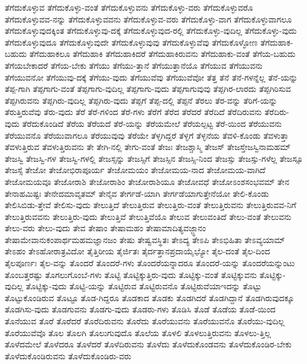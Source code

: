 {ತೆಗೆದುಕೊಳ್ಳುವ
ತೆಗೆದುಕೊಳ್ಳು-ವಂತೆ
ತೆಗೆದುಕೊಳ್ಳುವನು
ತೆಗೆದುಕೊಳ್ಳು-ವರು
ತೆಗೆದುಕೊಳ್ಳುವರೊ
ತೆಗೆದುಕೊಳ್ಳುವವ-ನನ್ನು
ತೆಗೆದುಕೊಳ್ಳುವವನು
ತೆಗೆದುಕೊಳ್ಳುವ-ವರು
ತೆಗೆದುಕೊಳ್ಳು-ವಾಗ
ತೆಗೆದುಕೊಳ್ಳುವಾಗಲೂ
ತೆಗೆದುಕೊಳ್ಳುವುದಕ್ಕಿಂತ
ತೆಗೆದುಕೊಳ್ಳುವು-ದಕ್ಕೆ
ತೆಗೆದುಕೊಳ್ಳುವುದ-ರಲ್ಲಿ
ತೆಗೆದುಕೊಳ್ಳು-ವುದಿಲ್ಲ
ತೆಗೆದುಕೊಳ್ಳು-ವುದು
ತೆಗೆದುಕೊಳ್ಳುವುದೂ
ತೆಗೆದುಕೊಳ್ಳುವುದೇ
ತೆಗೆದುಕೊಳ್ಳುವುವು
ತೆಗೆದುಕೊಳ್ಳುವೆವು
ತೆಗೆದುಕೊಳ್ಳೋಣ
ತೆಗೆದುಹಾಕ-ಬಹುದು
ತೆಗೆದುಹಾಕಲೂ
ತೆಗೆದುಹಾಕಿ
ತೆಗೆದುಹಾಕಿದರೆ
ತೆಗೆದುಹಾಕಿರುವನು
ತೆಗೆದುಹಾಕು-ವಂತೆ
ತೆಗೆಯ-ಬಹುದು
ತೆಗೆಯಬೇಕಾದರೆ
ತೆಗೆಯ-ಬೇಕು
ತೆಗೆಯು
ತೆಗೆಯು-ತ್ತಾನೆ
ತೆಗೆಯುತ್ತಾನೆಯೊ
ತೆಗೆಯುವ
ತೆಗೆಯುವನು
ತೆಗೆಯುವನೋ
ತೆಗೆಯುವು-ದಕ್ಕೆ
ತೆಗೆಯು-ವುದು
ತೆಗೆಯುವೆವು
ತೆಗೆಯುವೆವೋ
ತೆತ್ತ
ತೆನೆ
ತೆನೆ-ಗಳನ್ನೆಲ್ಲ
ತೆನೆ-ಯನ್ನು
ತೆಪ್ಪ-ಗಾಗಿ
ತೆಪ್ಪಗಾಗು-ವಂತೆ
ತೆಪ್ಪಗಾಗು-ವುದಿಲ್ಲ
ತೆಪ್ಪಗಾಗು-ವುದು
ತೆಪ್ಪಗಾಗುವುವು
ತೆಪ್ಪಗಿರ-ಲಾರದು
ತೆಪ್ಪಗಿರಿಸುವ
ತೆಪ್ಪಗಿರುವನು
ತೆಪ್ಪಗಿರು-ವುದಿಲ್ಲ
ತೆಪ್ಪಗಿರು-ವುದು
ತೆಪ್ಪಗೆ
ತೆಪ್ಪ-ದಲ್ಲಿ
ತೆಪ್ಪನೆ
ತೆರಲು
ತೆರ-ವನ್ನು
ತೆರಿಗೆ-ಯನ್ನು
ತೆರುತ್ತಿರುವೆವು
ತೆರು-ವುದು
ತೆರೆ
ತೆರೆ-ಗಳಿಂದ
ತೆರೆ-ಗಳು
ತೆರೆಗೆ
ತೆರೆದ
ತೆರೆದರೆ
ತೆರೆದಿದೆ
ತೆರೆದಿರುವನು
ತೆರೆದಿರು-ವುದು
ತೆರೆದುಕೊಂಡಿದೆ
ತೆರೆಯ
ತೆರೆಯದೆ
ತೆರೆ-ಯನ್ನು
ತೆರೆಯಮೇಲೆ
ತೆರೆಯಲ್ಪಟ್ಟ
ತೆರೆ-ಯಿಂದ
ತೆರೆಯುವನು
ತೆರೆಯುವನೊ
ತೆರೆಯುವಾಗಲೂ
ತೆರೆಯುವುವು
ತೆರೆಯೇ
ತೆಳ್ಳಗಿದ್ದರೆ
ತೆಳ್ಳಗೆ
ತೆಳ್ಳನೆಯ
ತೆವಳಿ-ಕೊಂಡು
ತೆವಳುತ್ತಾ
ತೆವಳುತ್ತಿರುವ
ತೆವಳುತ್ತಿರುವನು
ತೇ
ತೇಗಿ-ನಲ್ಲಿ
ತೇಗು-ವಂತೆ
ತೇಜಃ
ತೇಜಶ್ಚಾಸ್ಮಿ
ತೇಜಸ್
ತೇಜಸ್ತೇಜಸ್ವಿನಾಮಹಮ್
ತೇಜಸ್ವಿ
ತೇಜಸ್ವಿ-ಗಳ
ತೇಜಸ್ವಿ-ಗಳಲ್ಲಿ
ತೇಜಸ್ಸನ್ನು
ತೇಜಸ್ಸಿಗೆ
ತೇಜಸ್ಸಿನ
ತೇಜಸ್ಸಿ-ನಿಂದ
ತೇಜಸ್ಸು
ತೇಜಸ್ಸು-ಗಳೆಲ್ಲ
ತೇಜಸ್ಸೂ
ತೇಜಸ್ಸೆ
ತೇಜೋ
ತೇಜೋಭಿರಾಪೂರ್ಯ
ತೇಜೋಮಯಂ
ತೇಜೋಮಯ-ನಾದ
ತೇಜೋಮಯ-ವಾಗಿದೆ
ತೇಜೋಮಯವೂ
ತೇಜೋರಾಶಿ
ತೇಜೋರಾಶಿಂ
ತೇಜೋರಾಶಿಯೂ
ತೇಜೋವಧೆ
ತೇಜೋಽಂಶಸಂಭವಮ್
ತೇನ
ತೇನಾಹಮಿಷ್ಟಃ
ತೇನೇದಮಾವೃತಮ್
ತೇನೈವ
ತೇರ್ಗಡೆ-ಯಾಗಿ
ತೇರ್ಗಡೆಯಾಗುತ್ತೇನೆಯೋ
ತೇಲಿ-ಕೊಂಡು
ತೇಲಿಸಿಬಿಡು-ತ್ತೇವೆ
ತೇಲಿಸು-ವುದು
ತೇಲುತ್ತಿದೆ
ತೇಲುತ್ತಿರುವ
ತೇಲುತ್ತಿರು-ವಂತೆ
ತೇಲುತ್ತಿರುವನು
ತೇಲುತ್ತಿರುವವ-ನಿಗೆ
ತೇಲುತ್ತಿರುವವನು
ತೇಲುತ್ತಿರು-ವುದು
ತೇಲುತ್ತಿವೆ
ತೇಲುತ್ತಿವೆಯೊ
ತೇಲುವ
ತೇಲುವಂತಿದೆ
ತೇಲು-ವಂತೆ
ತೇಲುವನು
ತೇಲು-ವರು
ತೇಲು-ವುದು
ತೇವ
ತೇಷಾಂ
ತೇಷಾಮಹಂ
ತೇಷಾಮಾದಿತ್ಯವಜ್ಜ್ಞಾನಂ
ತೇಷಾಮೇವಾನುಕಂಪಾರ್ಥಮಹಮಜ್ಞಾನಜಂ
ತೇಷು
ತೇಷ್ವವಸ್ಥಿತಃ
ತೇಽದ್ಯ
ತೇಽಪಿ
ತೇಽಭಿಹಿತಾ
ತೇಽವ್ಯಯಾಮ್
ತೇಽಹಂ
ತೇಽಹೋರಾತ್ರವಿದೋ
ತೈತ್ತಿರೀಯ
ತೈರ್ಜಿತಃ
ತೈರ್ದತ್ತಾನಪ್ರದಾಯೈಭ್ಯೋ
ತೈಲ-ದಂತೆ
ತೈಲ-ದಿಂದ
ತೈಲಪೂರ್ಣಃ
ತೈಲ-ವನ್ನು
ತೊಂದರೆ
ತೊಂದರೆ-ಗಳು
ತೊಂದರೆಯನ್ನಾದರೂ
ತೊಂದರೆ-ಯನ್ನು
ತೊಂದರೆಯನ್ನುಂಟು
ತೊಂಬತ್ತರಷ್ಟು
ತೊಗಲುಗೊಂಬೆ-ಗಳು
ತೊಟ್ಟಿ
ತೊಟ್ಟಿಕ್ಕುತ್ತಿರು-ವುದು
ತೊಟ್ಟಿಕ್ಕು-ವಂತೆ
ತೊಟ್ಟಿಕ್ಕುವನು
ತೊಟ್ಟಿಕ್ಕು-ವುದಿಲ್ಲ
ತೊಟ್ಟಿಕ್ಕು-ವುದು
ತೊಟ್ಟಿ-ಯನ್ನು
ತೊಟ್ಟಿರುವ
ತೊಟ್ಟಿರುವನೊ
ತೊಟ್ಟಿರುವೆಯಾಇದನ್ನು
ತೊಟ್ಟು
ತೊಟ್ಟುಕೊಂಡಿರುವ
ತೊಟ್ಟೂ
ತೊಡ-ಗಿದ್ದರೂ
ತೊಡಕಾದ
ತೊಡಕು
ತೊಡಗಿದರೆ
ತೊಡಗಿದ್ದಾನೆ
ತೊಡಗಿರುವುದಕ್ಕೂ
ತೊಡಗಿಸು-ವುದು
ತೊಡಗುವನು
ತೊಡಗು-ವುದು
ತೊಡರು-ಗಳು
ತೊಡಿಸಿ
ತೊಡೆ
ತೊಡೆಯ
ತೊಡೆ-ಯಿಂದ
ತೊನೆಯುವ
ತೊರೆ
ತೊರೆದರೆ
ತೊರೆದಿರುವನು
ತೊರೆದು
ತೊರೆಯುವನು
ತೊರೆಯುವನೊ
ತೊರೆಯು-ವುದಿಲ್ಲ
ತೊರೆಯುವೆವೊ
ತೊಲ
ತೊಲಗಿ
ತೊಲುಗುವುದೊ
ತೊಲೆಯ
ತೊಳಲಿ
ತೊಳಲುತ್ತಿರುವನು
ತೊಳಲು-ತ್ತಿಲ್ಲ
ತೊಳೆದಮೇಲೆ
ತೊಳೆದರೂ
ತೊಳೆದರೆ
ತೊಳೆದಿರುವನು
ತೊಳೆದು
ತೊಳೆದುಕೊಂಡವನು
ತೊಳೆದುಕೊಂಡಿರ-ಬೇಕು
ತೊಳೆದುಕೊಂಡಿರುವನು
ತೊಳೆದುಕೊಂಡಿರು-ವರು
}
